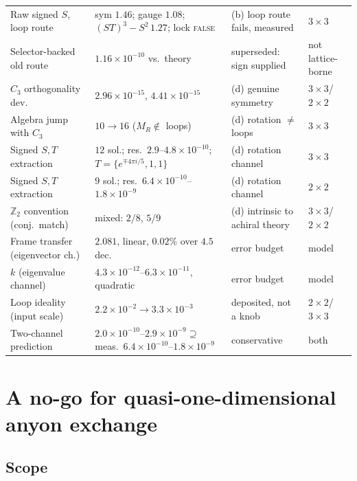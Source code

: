 \documentclass[aps,pra,twocolumn,superscriptaddress,longbibliography,floatfix,nofootinbib]{revtex4-2}
\begin{document}
\begin{table}[tp]
\begin{ruledtabular}
\begin{tabular}{llll}
Raw signed $S$, loop route & sym $1.46$; gauge $1.08$; $(ST)^{3}{-}S^{2}\,1.27$; lock \textsc{false} & (b) loop route fails, measured & $3\times3$ \\
Selector-backed old route & $1.16\times10^{-10}$ vs.\ theory & superseded: sign supplied & not lattice-borne \\
\colrule
$C_3$ orthogonality dev. & $2.96\times10^{-15}$, $4.41\times10^{-15}$ & (d) genuine symmetry & $3\times3$/$2\times2$ \\
Algebra jump with $C_3$ & $10\to16$ ($M_R\notin$ loops) & (d) rotation $\ne$ loops & $3\times3$ \\
Signed $S,T$ extraction & $12$ sol.; res.\ $2.9$--$4.8{\times}10^{-10}$; $T{=}\{e^{\mp4\pi i/5},1,1\}$ & (d) rotation channel & $3\times3$ \\
Signed $S,T$ extraction & $9$ sol.; res.\ $6.4{\times}10^{-10}$--$1.8{\times}10^{-9}$ & (d) rotation channel & $2\times2$ \\
$\mathbb{Z}_2$ convention (conj.\ match) & mixed: $2/8$, $5/9$ & (d) intrinsic to achiral theory & $3\times3$/$2\times2$ \\
\colrule
Frame transfer (eigenvector ch.) & $2.081$, linear, $0.02\%$ over $4.5$ dec. & error budget & model \\
$k$ (eigenvalue channel) & $4.3\times10^{-12}$--$6.3\times10^{-11}$, quadratic & error budget & model \\
Loop ideality (input scale) & $2.2\times10^{-2}\to3.3\times10^{-3}$ & deposited, not a knob & $2\times2$/$3\times3$ \\
Two-channel prediction & $2.0{\times}10^{-10}$--$2.9{\times}10^{-9}\supseteq$ meas.\ $6.4{\times}10^{-10}$--$1.8{\times}10^{-9}$ & conservative & both \\
\end{tabular}
\end{ruledtabular}
\end{table}

\section{A no-go for quasi-one-dimensional anyon exchange}
\label{sec:nogo}

\subsection{Scope}
\label{sec:nogoscope}
\end{document}
